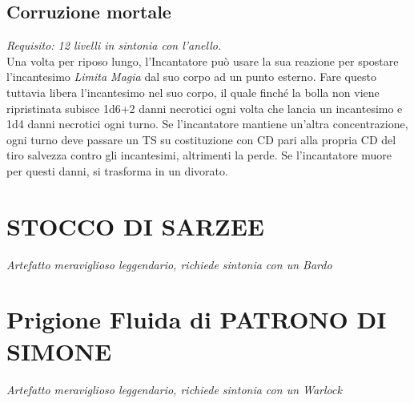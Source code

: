 \subsection{Corruzione mortale}
\textit{Requisito: 12 livelli in sintonia con l'anello.}\\
Una volta per riposo lungo, l'Incantatore può usare la sua reazione per spostare l'incantesimo \textit{Limita Magia} dal suo corpo ad un punto esterno. Fare questo tuttavia libera l'incantesimo nel suo corpo, il quale finché la bolla non viene ripristinata subisce 1d6+2 danni necrotici ogni volta che lancia un incantesimo e 1d4 danni necrotici ogni turno. Se l'incantatore mantiene un'altra concentrazione, ogni turno deve passare un TS su costituzione con CD pari alla propria CD del tiro salvezza contro gli incantesimi, altrimenti la perde. Se l'incantatore muore per questi danni, si trasforma in un divorato.

\section{STOCCO DI SARZEE}

\textit{Artefatto meraviglioso leggendario, richiede sintonia con un Bardo}

\section{Prigione Fluida di PATRONO DI SIMONE}

\textit{Artefatto meraviglioso leggendario, richiede sintonia con un Warlock}


